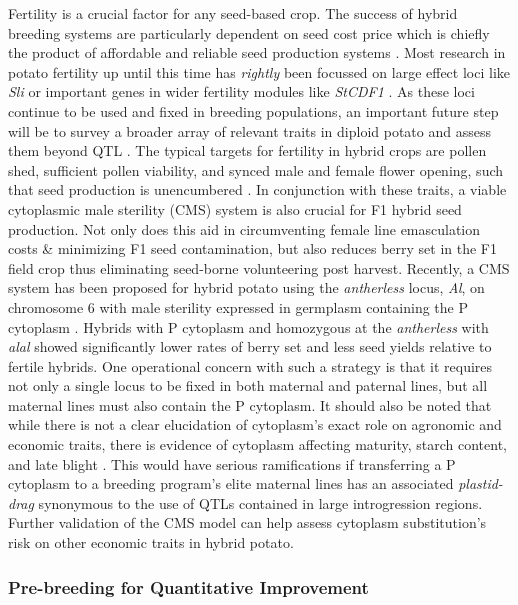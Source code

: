 \documentclass[
]{article}
\begin{document}
Fertility is a crucial factor for any seed-based crop. The success of
hybrid breeding systems are particularly dependent on seed cost price
which is chiefly the product of affordable and reliable seed production
systems \autocite{Mao1998,Longin2014}. Most research in potato fertility
up until this time has \emph{rightly} been focussed on large effect loci
like \emph{Sli} or important genes in wider fertility modules like
\emph{StCDF1} \autocite{Clot2020,Eggers2021,Song2022}. As these loci
continue to be used and fixed in breeding populations, an important
future step will be to survey a broader array of relevant traits in
diploid potato and assess them beyond QTL \autocite{Kempe2011}. The
typical targets for fertility in hybrid crops are pollen shed,
sufficient pollen viability, and synced male and female flower opening,
such that seed production is unencumbered
\autocite{Ortiz1997,Longin2012}. In conjunction with these traits, a
viable cytoplasmic male sterility (CMS) system is also crucial for F1
hybrid seed production. Not only does this aid in circumventing female
line emasculation costs \& minimizing F1 seed contamination, but also
reduces berry set in the F1 field crop thus eliminating seed-borne
volunteering post harvest. Recently, a CMS system has been proposed for
hybrid potato using the \emph{antherless} locus, \emph{Al}, on
chromosome 6 with male sterility expressed in germplasm containing the P
cytoplasm \autocite{Eggers2024}. Hybrids with P cytoplasm and homozygous
at the \emph{antherless} with \emph{alal} showed significantly lower
rates of berry set and less seed yields relative to fertile hybrids. One
operational concern with such a strategy is that it requires not only a
single locus to be fixed in both maternal and paternal lines, but all
maternal lines must also contain the P cytoplasm. It should also be
noted that while there is not a clear elucidation of cytoplasm's exact
role on agronomic and economic traits, there is evidence of cytoplasm
affecting maturity, starch content, and late blight
\autocite{Sanetomo2015}. This would have serious ramifications if
transferring a P cytoplasm to a breeding program's elite maternal lines
has an associated \emph{plastid-drag} synonymous to the use of QTLs
contained in large introgression regions. Further validation of the CMS
model can help assess cytoplasm substitution's risk on other economic
traits in hybrid potato.

\subsubsection{Pre-breeding for Quantitative
Improvement}\label{pre-breeding-for-quantitative-improvement}
\end{document}
